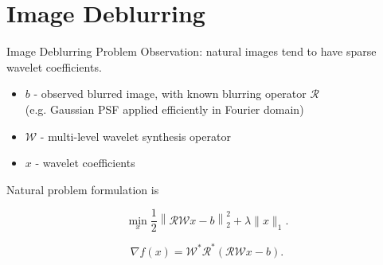 \documentclass[xcolor=dvipsnames,t]{beamer} %
\begin{document}
\section{Image Deblurring}
\begin{frame}{Image Deblurring Problem}
   Observation: natural images tend to have sparse wavelet coefficients.\\
   
   \begin{itemize}
      \item $b$ - observed blurred image, with known blurring operator $\mathcal{R}$\\ (e.g. Gaussian PSF applied efficiently in Fourier domain)
      \item $\mathcal{W}$ - multi-level wavelet synthesis operator
      \item $x$ - wavelet coefficients
   \end{itemize}

   Natural problem formulation is

   \[ \min_x \dfrac{1}{2}\left\|\mathcal{RW}x-b\right\|_2^2 + \lambda \|x\|_1. \]

   \[ \nabla f(x) = \mathcal{W}^\ast\mathcal{R}^\ast\left(\mathcal{RW}x-b\right). \] 

\end{frame}
\end{document}
